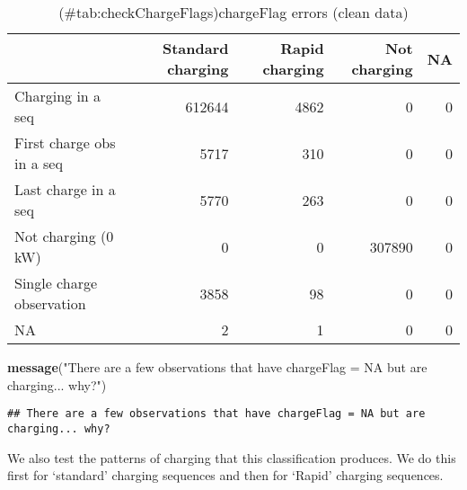 \documentclass[]{article}
\newenvironment{Shaded}{\begin{snugshade}}{\end{snugshade}}
\newcommand{\KeywordTok}[1]{\textcolor[rgb]{0.13,0.29,0.53}{\textbf{#1}}}
\newcommand{\NormalTok}[1]{#1}
\newcommand{\StringTok}[1]{\textcolor[rgb]{0.31,0.60,0.02}{#1}}
\begin{document}
\begin{table}[t]

\caption{(\#tab:checkChargeFlags)chargeFlag errors (clean data)}
\centering
\begin{tabular}{l|r|r|r|r}
\hline
  & Standard charging & Rapid charging & Not charging & NA\\
\hline
Charging in a seq & 612644 & 4862 & 0 & 0\\
\hline
First charge obs in a seq & 5717 & 310 & 0 & 0\\
\hline
Last charge in a seq & 5770 & 263 & 0 & 0\\
\hline
Not charging (0 kW) & 0 & 0 & 307890 & 0\\
\hline
Single charge observation & 3858 & 98 & 0 & 0\\
\hline
NA & 2 & 1 & 0 & 0\\
\hline
\end{tabular}
\end{table}

\begin{Shaded}
\begin{Highlighting}[]
\KeywordTok{message}\NormalTok{(}\StringTok{"There are a few observations that have chargeFlag = NA but are charging... why?"}\NormalTok{)}
\end{Highlighting}
\end{Shaded}

\begin{verbatim}
## There are a few observations that have chargeFlag = NA but are charging... why?
\end{verbatim}

We also test the patterns of charging that this classification produces. We do this first for `standard' charging sequences and then for `Rapid' charging sequences.
\end{document}
